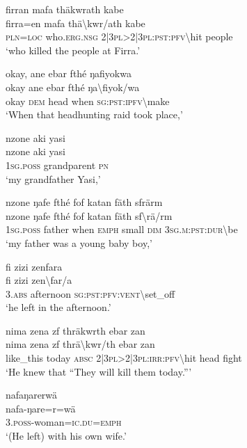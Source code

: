 \ea\label{ex:4:a1669}
firran mafa thäkwrath kabe\\
\gll firra=en	mafa	thä{\textbackslash}kwr/ath	kabe\\
     \textsc{pln}=\textsc{loc}	who.\textsc{erg}.\textsc{nsg}	2|3\textsc{pl}>2|3\textsc{pl}:\textsc{pst}:\textsc{pfv}{\textbackslash}hit	people\\
\glt `who killed the people at Firra.'
\z

\ea\label{ex:4:a1670}
okay, ane ebar fthé ŋafiyokwa\\
\gll okay	ane	ebar	fthé	ŋa{\textbackslash}fiyok/wa\\
     okay	\textsc{dem}	head	when	\textsc{sg}:\textsc{pst}:\textsc{ipfv}{\textbackslash}make\\
\glt `When that headhunting raid took place,'
\z

\ea\label{ex:4:a1671}
nzone aki yasi\\
\gll nzone	aki	yasi\\
     1\textsc{sg}.\textsc{poss}	grandparent	\textsc{pn}\\
\glt `my grandfather Yasi,'
\z

\ea\label{ex:4:a1673}
nzone ŋafe fthé fof katan fäth sfrärm\\
\gll nzone	ŋafe	fthé	fof	katan	fäth	sf{\textbackslash}rä/rm\\
     1\textsc{sg}.\textsc{poss}	father	when	\textsc{emph}	small	\textsc{dim}	3\textsc{sg}.\textsc{m}:\textsc{pst}:\textsc{dur}{\textbackslash}be\\
\glt `my father was a young baby boy,'
\z

\ea\label{ex:4:a1674}
fi zizi zenfara\\
\gll fi	zizi	zen{\textbackslash}far/a\\
     3.\textsc{abs}	afternoon	\textsc{sg}:\textsc{pst}:\textsc{pfv}:\textsc{vent}{\textbackslash}set\_off\\
\glt `he left in the afternoon.'
\z

\ea\label{ex:4:a1675}
nima zena zf thräkwrth ebar zan\\
\gll nima	zena	zf	thrä{\textbackslash}kwr/th	ebar	zan\\
     like\_this	today	\textsc{absc}	2|3\textsc{pl}>2|3\textsc{pl}:\textsc{irr}:\textsc{pfv}{\textbackslash}hit	head	fight\\
\glt `He knew that ``They will kill them today.'''
\z

\ea\label{ex:4:a1676}
nafaŋarerwä\\
\gll nafa-ŋare=r=wä\\
     3.\textsc{poss}-woman=\textsc{ic}.\textsc{du}=\textsc{emph}\\
\glt `(He left) with his own wife.'
\z

